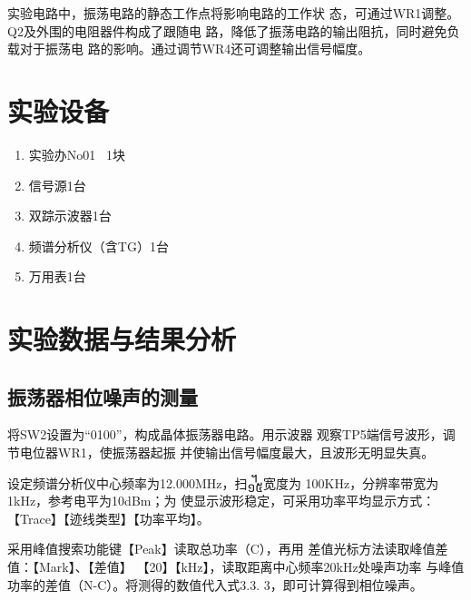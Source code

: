 \documentclass{../source/Experiment}
\begin{document}
    实验电路中，振荡电路的静态工作点将影响电路的工作状
    态，可通过WR1调整。Q2及外围的电阻器件构成了跟随电
    路，降低了振荡电路的输出阻抗，同时避免负载对于振荡电
    路的影响。通过调节WR4还可调整输出信号幅度。


    \section{实验设备}
        \begin{enumerate}
            \item 实验办No01 \, 1块
            \item 信号源1台
            \item 双踪示波器1台
            \item 频谱分析仪（含TG）1台
            \item 万用表1台
        \end{enumerate}
        
    \section{实验数据与结果分析}
        \subsection{振荡器相位噪声的测量}

        将SW2设置为“0100”，构成晶体振荡器电路。用示波器
        观察TP5端信号波形，调节电位器WR1，使振荡器起振
        并使输出信号幅度最大，且波形无明显失真。

        设定频谱分析仪中心频率为12.000MHz，扫᧿宽度为
        100KHz，分辨率带宽为1kHz，参考电平为10dBm；为
        使显示波形稳定，可采用功率平均显示方式：【Trace】【迹线类型】【功率平均】。

        采用峰值搜索功能键【Peak】读取总功率（C），再用
        差值光标方法读取峰值差值：【Mark】、【差值】
        【20】【kHz】，读取距离中心频率20kHz处噪声功率
        与峰值功率的差值（N-C）。将测得的数值代入式3.3.
        3，即可计算得到相位噪声。
 
\end{document}
